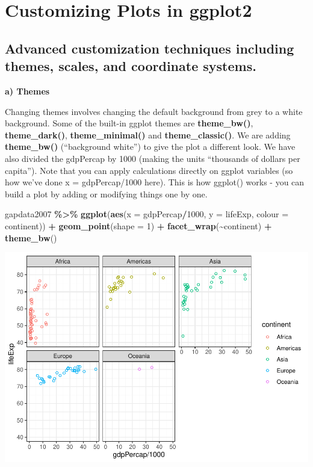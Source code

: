 \documentclass[
]{book}
\newenvironment{Shaded}{\begin{snugshade}}{\end{snugshade}}
\newcommand{\AttributeTok}[1]{\textcolor[rgb]{0.13,0.29,0.53}{#1}}
\newcommand{\DecValTok}[1]{\textcolor[rgb]{0.00,0.00,0.81}{#1}}
\newcommand{\FunctionTok}[1]{\textcolor[rgb]{0.13,0.29,0.53}{\textbf{#1}}}
\newcommand{\NormalTok}[1]{#1}
\newcommand{\SpecialCharTok}[1]{\textcolor[rgb]{0.81,0.36,0.00}{\textbf{#1}}}
\begin{document}
\section{Customizing Plots in ggplot2}\label{customizing-plots-in-ggplot2}

\subsection{Advanced customization techniques including themes, scales, and coordinate systems.}\label{advanced-customization-techniques-including-themes-scales-and-coordinate-systems.}

\textbf{a) Themes}

Changing themes involves changing the default background from grey to a white background. Some of the built-in ggplot themes are \textbf{theme\_bw()},
\textbf{theme\_dark()}, \textbf{theme\_minimal()} and \textbf{theme\_classic()}. We are adding \textbf{theme\_bw()} (``background white'') to give the plot a different look. We have also divided the gdpPercap by 1000 (making the units ``thousands of dollars per capita''). Note that you can apply calculations
directly on ggplot variables (so how we've done x = gdpPercap/1000 here). This is how ggplot() works - you can build a plot by adding or modifying things one by one.

\begin{Shaded}
\begin{Highlighting}[]
\NormalTok{gapdata2007 }\SpecialCharTok{\%\textgreater{}\%}
\FunctionTok{ggplot}\NormalTok{(}\FunctionTok{aes}\NormalTok{(}\AttributeTok{x =}\NormalTok{ gdpPercap}\SpecialCharTok{/}\DecValTok{1000}\NormalTok{, }\AttributeTok{y =}\NormalTok{ lifeExp, }\AttributeTok{colour =}\NormalTok{ continent)) }\SpecialCharTok{+}
\FunctionTok{geom\_point}\NormalTok{(}\AttributeTok{shape =} \DecValTok{1}\NormalTok{) }\SpecialCharTok{+}
\FunctionTok{facet\_wrap}\NormalTok{(}\SpecialCharTok{\textasciitilde{}}\NormalTok{continent) }\SpecialCharTok{+}
\FunctionTok{theme\_bw}\NormalTok{()}
\end{Highlighting}
\end{Shaded}

\includegraphics{_main_files/figure-latex/unnamed-chunk-84-1.pdf}
\end{document}
